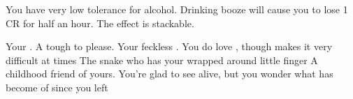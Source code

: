 \documentclass[char]{Pestilence}
\begin{document}
\begin{itemz}[Notes]
	\item You have very low tolerance for alcohol. Drinking booze will cause you to lose 1 CR for half an hour. The effect is stackable.
\end{itemz}

\begin{contacts}
	\contact{\cElder{}} Your \cElder{\parent}. A tough \cElder{\human} to please.
	\contact{\cRebel{}} Your feckless \cRebel{\sibling}. You do love \cRebel{\them}, though \cRebel{\they} makes it very difficult at times
	\contact{\cOutsider{}} The snake who has your \cRebel{\sibling} wrapped around \cOutsider{\their} little finger 
	\contact{\cCon{}} A childhood friend of yours. You're glad to see \cCon{\them} alive, but you wonder what has become of \cCon{\them} since you left  
\end{contacts}
\end{document}
